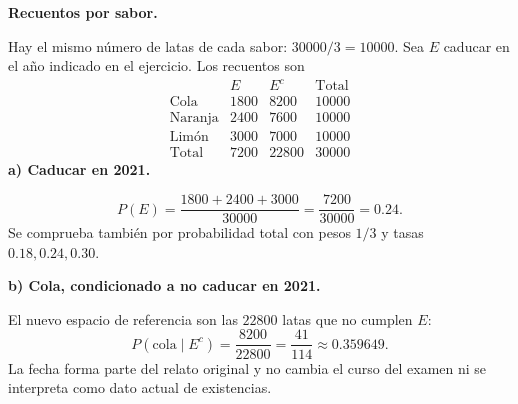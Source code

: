 \textbf{Recuentos por sabor.}\par\nopagebreak[4]
Hay el mismo número de latas de cada sabor: $30000/3=10000$. Sea $E$ caducar en el año indicado en el ejercicio. Los recuentos son
\[
\begin{array}{c|rr|r}
&E&E^c&\text{Total}\\\hline
\text{Cola}&1800&8200&10000\\
\text{Naranja}&2400&7600&10000\\
\text{Limón}&3000&7000&10000\\\hline
\text{Total}&7200&22800&30000
\end{array}
\]
\textbf{a) Caducar en 2021.}\par\nopagebreak[4]
\[
\boxed{P(E)=\frac{1800+2400+3000}{30000}=\frac{7200}{30000}=0.24.}
\]
Se comprueba también por probabilidad total con pesos $1/3$ y tasas $0.18,0.24,0.30$.

\textbf{b) Cola, condicionado a no caducar en 2021.}\par\nopagebreak[4]
El nuevo espacio de referencia son las $22800$ latas que no cumplen $E$:
\[
\boxed{P(\text{cola}\mid E^c)=\frac{8200}{22800}=\frac{41}{114}\approx0.359649.}
\]
La fecha forma parte del relato original y no cambia el curso del examen ni se interpreta como dato actual de existencias.
